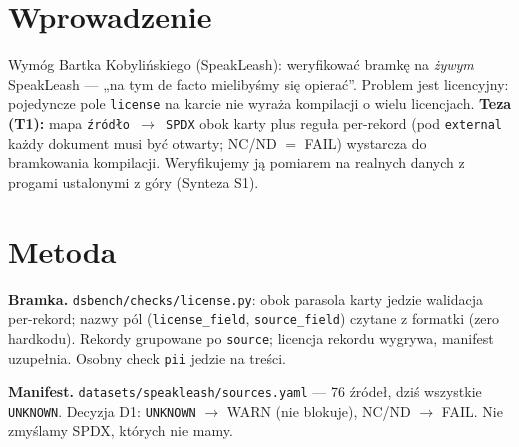 
\begin{abstract}
\noindent Realny korpus treningowy (SpeakLeash, polish-dynaword) to \emph{kompilacja}
wielu źródeł o różnych licencjach; karta datasetu z jedną licencją uśrednia je i
przepuszcza zatrucie (jedno źródło NC/ND „chowa się'' pod parasolem). Zbudowaliśmy
dwupoziomową bramkę licencyjną (\texttt{slayer-dsbench}): parasol karty + reguła
per-dokument/źródło przez manifest \texttt{sources.yaml}. Raport dowodzi jej na
\textbf{żywym} SpeakLeash: fixture w CI = PASS, realny shard = PASS, a realny slice
2211 dokumentów = FAIL na 18 numerach PESEL --- czyli bramka działa i realnie odrzuca
zatrutą kompilację. Otwarte: realne SPDX 76 źródeł i port silnikowej bramki Bartka
--- oba czekają na dane od SpeakLeash.
\end{abstract}

\section{Wprowadzenie}
Wymóg Bartka Kobylińskiego (SpeakLeash): weryfikować bramkę na \emph{żywym} SpeakLeash
--- „na tym de facto mielibyśmy się opierać''. Problem jest licencyjny: pojedyncze pole
\texttt{license} na karcie nie wyraża kompilacji o wielu licencjach. \textbf{Teza (T1):}
mapa \texttt{źródło $\to$ SPDX} obok karty plus reguła per-rekord (pod \texttt{external}
każdy dokument musi być otwarty; NC/ND $=$ FAIL) wystarcza do bramkowania kompilacji.
Weryfikujemy ją pomiarem na realnych danych z progami ustalonymi z góry (Synteza S1).

\section{Metoda}
\textbf{Bramka.} \texttt{dsbench/checks/license.py}: obok parasola karty jedzie
walidacja per-rekord; nazwy pól (\texttt{license\_field}, \texttt{source\_field})
czytane z formatki (zero hardkodu). Rekordy grupowane po \texttt{source}; licencja
rekordu wygrywa, manifest uzupełnia. Osobny check \texttt{pii} jedzie na treści.

\textbf{Manifest.} \texttt{datasets/speakleash/sources.yaml} --- 76 źródeł, dziś
wszystkie \texttt{UNKNOWN}. Decyzja D1: \texttt{UNKNOWN} $\to$ WARN (nie blokuje),
NC/ND $\to$ FAIL. Nie zmyślamy SPDX, których nie mamy.


